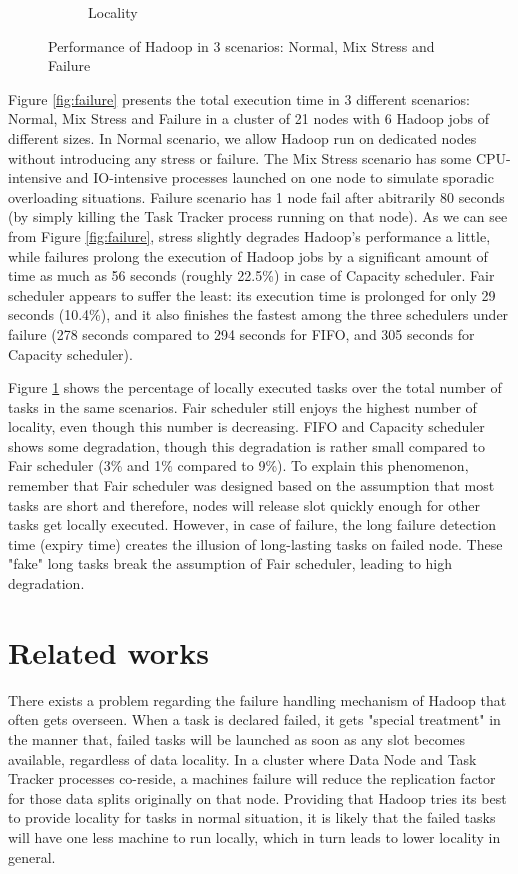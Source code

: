 \documentclass[runningheads,a4paper]{llncs}
\begin{document}
\begin{figure}
\begin{subfigure}{.5\textwidth}
  \caption{Locality}
  \label{fig:localWFailure}
\end{subfigure}
\caption{Performance of Hadoop in 3 scenarios: Normal, Mix Stress and Failure}
\label{fig:test}
\end{figure}

Figure \ref{fig:failure} presents the total execution time in 3 different scenarios: Normal, Mix Stress and Failure in a cluster of 21 nodes with 6 Hadoop jobs of different sizes. In Normal scenario, we allow Hadoop run on dedicated nodes without introducing any stress or failure. The Mix Stress scenario has some CPU-intensive and IO-intensive processes launched on one node to simulate sporadic overloading situations. Failure scenario has 1 node fail after abitrarily 80 seconds (by simply killing the Task Tracker process running on that node). As we can see from Figure \ref{fig:failure}, stress slightly degrades Hadoop's performance a little, while failures prolong the execution of Hadoop jobs by a significant amount of time as much as 56 seconds (roughly 22.5\%) in case of Capacity scheduler.  Fair scheduler appears to suffer the least: its execution time is prolonged for only 29 seconds (10.4\%), and it also finishes the fastest among the three schedulers under failure (278 seconds compared to 294 seconds for FIFO, and 305 seconds for Capacity scheduler).


Figure \ref{fig:localWFailure} shows the percentage of locally executed tasks over the total number of tasks in the same scenarios. Fair scheduler still enjoys the highest number of locality, even though this number is decreasing. FIFO and Capacity scheduler shows some degradation, though this degradation is rather small compared to Fair scheduler (3\% and 1\% compared to 9\%). To explain this phenomenon, remember that Fair scheduler was designed based on the assumption that most tasks are short and therefore, nodes will release slot quickly enough for other tasks get locally executed. However, in case of failure, the long failure detection time (expiry time) creates the illusion of long-lasting tasks on failed node. These "fake" long tasks break the assumption of Fair scheduler, leading to high degradation.

\section{Related works}
There exists a problem regarding the failure handling mechanism of Hadoop that often gets overseen. When a task is declared failed, it gets "special treatment" in the manner that, failed tasks will be launched as soon as any slot becomes available, regardless of data locality. In a cluster where Data Node and Task Tracker processes co-reside, a machines failure will reduce the replication factor for those data splits originally on that node. Providing that Hadoop tries its best to provide locality for tasks in normal situation, it is likely that the failed tasks will have one less machine to run locally, which in turn leads to lower locality in general.
\end{document}
